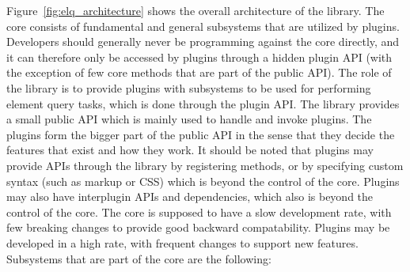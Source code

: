 \documentclass[a4paper,11pt]{kth-mag}
\begin{document}
      Figure~\ref{fig:elq_architecture} shows the overall architecture of the library.
      The core consists of fundamental and general subsystems that are utilized by plugins.
      Developers should generally never be programming against the core directly, and it can therefore only be accessed by plugins through a hidden plugin \gls{API} (with the exception of few core methods that are part of the public \gls{API}).
      The role of the library is to provide plugins with subsystems to be used for performing element query tasks, which is done through the plugin \gls{API}.
      The library provides a small public \gls{API} which is mainly used to handle and invoke plugins.
      The plugins form the bigger part of the public \gls{API} in the sense that they decide the features that exist and how they work.
      It should be noted that plugins may provide \glspl{API} through the library by registering methods, or by specifying custom syntax (such as markup or \gls{CSS}) which is beyond the control of the core.
      Plugins may also have interplugin \glspl{API} and dependencies, which also is beyond the control of the core.
      The core is supposed to have a slow development rate, with few breaking changes to provide good backward compatability.
      Plugins may be developed in a high rate, with frequent changes to support new features.
      Subsystems that are part of the core are the following:
\end{document}
